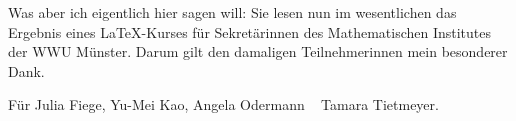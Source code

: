 Was aber ich eigentlich hier sagen will: Sie lesen nun im wesentlichen das Ergebnis eines \LaTeX-Kurses für Sekretärinnen des Mathematischen Institutes der WWU Münster. Darum gilt den damaligen Teilnehmerinnen mein besonderer Dank.

\newpage
\pagestyle{empty}
\mbox{}\vfill
\begin{center}
\large
Für Julia Fiege, Yu-Mei Kao, Angela Odermann \amper~ Tamara Tietmeyer.
\normalsize
\end{center}
\vfill\mbox{}\newpage
\pagestyle{headings}